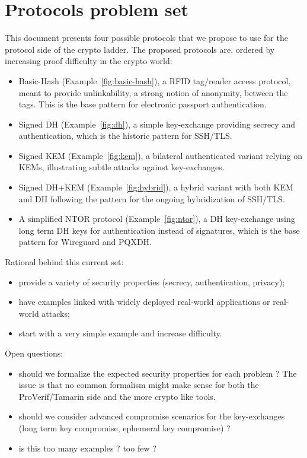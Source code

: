 \documentclass{article}
\begin{document}
\section{Protocols problem set}

This document presents four possible protocols that we propose to use for the protocol side of the crypto ladder. The proposed protocols are, ordered by increasing proof difficulty in the crypto world:
\begin{itemize}
\item Basic-Hash (Example~\ref{fig:basic-hash}), a RFID tag/reader access protocol, meant to provide unlinkability, a strong notion of anonymity, between the tags. This is the base pattern for electronic passport authentication.
\item Signed DH (Example~\ref{fig:dh}), a simple key-exchange providing secrecy and authentication,  which is the historic pattern for SSH/TLS.
\item Signed KEM (Example~\ref{fig:kem}), a bilateral authenticated variant relying on KEMs, illustrating subtle attacks against key-exchanges. 
\item  Signed DH+KEM (Example~\ref{fig:hybrid}), a hybrid variant with both KEM and DH following the pattern for the ongoing hybridization of SSH/TLS.
\item A simplified NTOR protocol (Example~\ref{fig:ntor}), a DH key-exchange using long term DH keys for authentication instead of signatures, which is the base pattern for Wireguard and PQXDH.
\end{itemize}

Rational behind this current set:
\begin{itemize}
\item provide a variety of security properties (secrecy, authentication, privacy);
\item have examples linked with widely deployed real-world applications or real-world attacks;
\item start with a very simple example and increase difficulty. 
\end{itemize}

Open questions:
\begin{itemize}
\item should we formalize the expected security properties for each problem ? The issue is that no common formalism might make sense for both the ProVerif/Tamarin side and the more crypto like tools.
\item should we consider advanced compromise scenarios for the key-exchanges (long term key compromise, ephemeral key compromise) ?  
\item is this too many examples ? too few ?  
  
\end{itemize}
\end{document}
